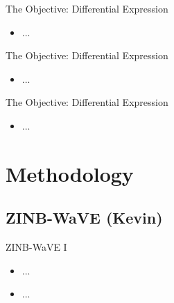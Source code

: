 \documentclass{beamer}
\begin{document}
\begin{frame}{The Objective: Differential Expression}

\begin{itemize}
  \itemsep10pt
  \item ...
\end{itemize}

\end{frame}


\begin{frame}{The Objective: Differential Expression}

\begin{itemize}
  \itemsep10pt
  \item ...
\end{itemize}

\end{frame}


\begin{frame}{The Objective: Differential Expression}

\begin{itemize}
  \itemsep10pt
  \item ...
\end{itemize}

\end{frame}

\section{Methodology}
\subsection{ZINB-WaVE (Kevin)}

\begin{frame}{ZINB-WaVE I}

\begin{itemize}
  \itemsep10pt
  \item ...
  \item ...
\end{itemize}

\end{frame}
\end{document}
